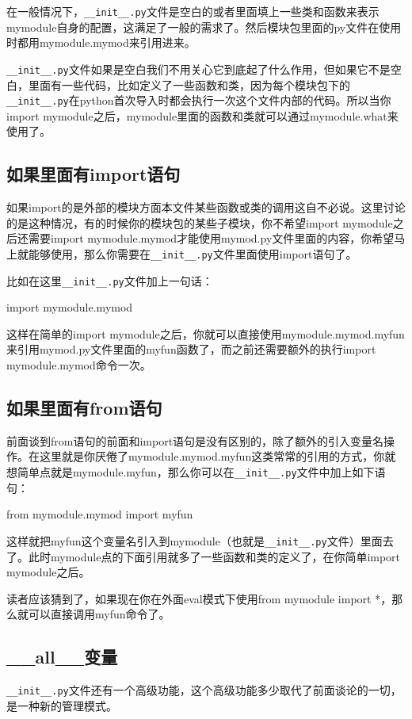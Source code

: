 \documentclass[12pt,oneside]{book}
\begin{document}
\begin{common-format}
在一般情况下，\verb+__init__.py+文件是空白的或者里面填上一些类和函数来表示mymodule自身的配置，这满足了一般的需求了。然后模块包里面的py文件在使用时都用mymodule.mymod来引用进来。

\verb+__init__.py+文件如果是空白我们不用关心它到底起了什么作用，但如果它不是空白，里面有一些代码，比如定义了一些函数和类，因为每个模块包下的\verb+__init__.py+在python首次导入时都会执行一次这个文件内部的代码。所以当你import mymodule之后，mymodule里面的函数和类就可以通过mymodule.what来使用了。

\subsection{如果里面有import语句}
如果import的是外部的模块方面本文件某些函数或类的调用这自不必说。这里讨论的是这种情况，有的时候你的模块包的某些子模块，你不希望import mymodule之后还需要import mymodule.mymod才能使用mymod.py文件里面的内容，你希望马上就能够使用，那么你需要在\verb+__init__.py+文件里面使用import语句了。

比如在这里\verb+__init__.py+文件加上一句话：
\begin{tcbpython}
import mymodule.mymod
\end{tcbpython}

这样在简单的import mymodule之后，你就可以直接使用mymodule.mymod.myfun来引用mymod.py文件里面的myfun函数了，而之前还需要额外的执行import mymodule.mymod命令一次。


\subsection{如果里面有from语句}
前面谈到from语句的前面和import语句是没有区别的，除了额外的引入变量名操作。在这里就是你厌倦了mymodule.mymod.myfun这类常常的引用的方式，你就想简单点就是mymodule.myfun，那么你可以在\verb+__init__.py+文件中加上如下语句：
\begin{tcbpython}[]
from mymodule.mymod import myfun
\end{tcbpython}
这样就把myfun这个变量名引入到mymodule（也就是\verb+__init__.py+文件）里面去了。此时mymodule点的下面引用就多了一些函数和类的定义了，在你简单import mymodule之后。

读者应该猜到了，如果现在你在外面eval模式下使用from mymodule import *，那么就可以直接调用myfun命令了。


\subsection{\_{}\_{}all\_{}\_{}变量}
\verb+__init__.py+文件还有一个高级功能，这个高级功能多少取代了前面谈论的一切，是一种新的管理模式。


\end{common-format}
\end{document}
